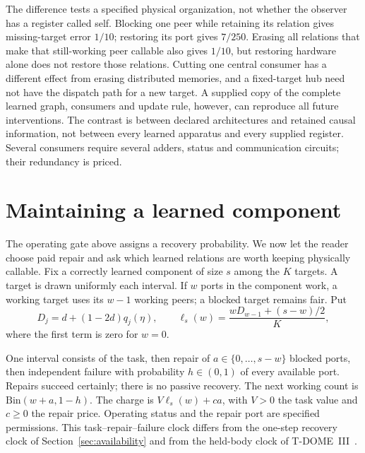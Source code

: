 \documentclass[11pt]{article}
\theoremstyle{definition}
\theoremstyle{remark}
\begin{document}
The difference tests a specified physical organization, not whether
the observer has a register called self.
Blocking one peer while retaining its relation gives missing-target
error $1/10$; restoring its port gives $7/250$. Erasing all relations
that make that still-working peer callable also gives $1/10$, but
restoring hardware alone does not restore those relations. Cutting
one central consumer has a different effect from erasing distributed
memories, and a fixed-target hub need not have the dispatch path for
a new target. A supplied copy of the complete learned graph,
consumers and update rule, however, can reproduce all future
interventions. The contrast is between declared architectures and
retained causal information, not between every learned apparatus
and every supplied register. Several consumers require several
adders, status and communication circuits; their redundancy is priced.

\section{Maintaining a learned component}
\label{sec:maintained}

The operating gate above assigns a recovery probability. We now let the
reader choose paid repair and ask which learned relations are worth
keeping physically callable. Fix a correctly learned component of size
$s$ among the $K$ targets. A target is drawn uniformly each interval.
If $w$ ports in the component work, a working target uses its $w-1$
working peers; a blocked target remains fair. Put
\begin{equation}\label{eq:component_loss}
 D_j=d+(1-2d)q_j(\eta),\qquad
 \ell_s(w)=\frac{wD_{w-1}+(s-w)/2}{K},
\end{equation}
where the first term is zero for $w=0$.

One interval consists of the task, then repair of $a\in\{0,\ldots,s-w\}$
blocked ports, then independent failure with probability $h\in(0,1)$
of every available port. Repairs succeed certainly; there is no passive
recovery. The next working count is $\mathrm{Bin}(w+a,1-h)$. The charge
is $V\ell_s(w)+ca$, with $V>0$ the task value and $c\ge0$ the repair
price. Operating status and the repair port are specified permissions.
This task--repair--failure clock differs from the one-step recovery
clock of Section~\ref{sec:availability} and from the held-body clock of
T-DOME~III~\cite{TDOMEIII}.
\end{document}
